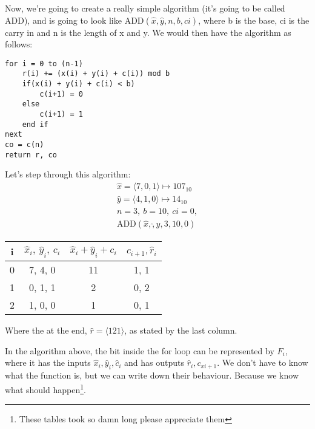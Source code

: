 \documentclass[11pt,a4paper,titlepage,dvipsnames,cmyk]{scrartcl}
\begin{document}
Now, we're going to create a really simple algorithm (it's going to be called
ADD), and is going to look like $\text{ADD}(\hat x, \hat y, n, b, ci)$, where b
is the base, ci is the carry in and n is the length of x and y. We would then
have the algorithm as follows:
\begin{lstlisting}[style=B]
for i = 0 to (n-1)
    r(i) += (x(i) + y(i) + c(i)) mod b
    if(x(i) + y(i) + c(i) < b)
        c(i+1) = 0
    else
        c(i+1) = 1
    end if
next
co = c(n)
return r, co
\end{lstlisting}

Let's step through this algorithm:
\begin{gather*}
    \hat x = \langle 7, 0, 1 \rangle \mapsto 107_{10} \\
    \hat y = \langle 4, 1, 0 \rangle \mapsto 14_{10} \\
    n = 3, \ b = 10, \ ci = 0, \\
    \text{ADD}(\hat x, \hat, y, 3, 10, 0)
\end{gather*}

\begin{center}
    \begin{tabular}{|c|c|c|c|}
        \hline
        i & $\hat x_i, \ \hat y_i, \ c_i$ & $\hat x_i + \hat y_i + c_i$ &
        $c_{i+1}, \hat r_i$\\
        \hline
        0 & 7, 4, 0 & 11 & 1, 1 \\
        \hline
        1 & 0, 1, 1 & 2 & 0, 2 \\
        \hline
        2 & 1, 0, 0 & 1 & 0, 1 \\
        \hline
    \end{tabular}
\end{center}

Where the at the end, $\hat r = \langle 1 2 1 \rangle$, as stated by the last
column.

In the algorithm above, the bit inside the for loop can be represented by $F_i$,
where it has the inputs $\hat x_i, \hat y_i, \hat c_i$ and has outputs 
$\hat r_i,c_{xi+1}$. We don't have to know what the function is, but we can write
down their behaviour. Because we know what should happen\footnote[1]{These tables
took so damn long please appreciate them}.
\end{document}
